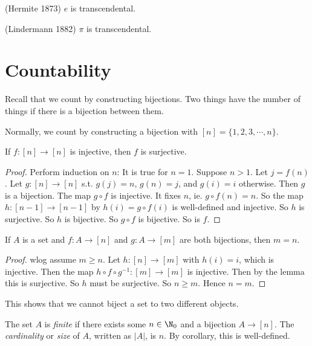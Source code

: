 \documentclass[a4paper]{article}
\begin{document}
  \begin{thm}
    (Hermite 1873) $e$ is transcendental. 
  \end{thm}
  \begin{thm}
    (Lindermann 1882) $\pi$ is transcendental.
  \end{thm}

  \section{Countability}
  Recall that we count by constructing bijections. Two things have the number of things if there is a bijection between them.

  Normally, we count by constructing a bijection with $[n] = \{1, 2, 3, \cdots, n\}$.

  \begin{lemma}
    If $f:[n] \to [n]$ is injective, then $f$ is surjective. 
  \end{lemma}

  \begin{proof}
    Perform induction on $n$: It is true for $n = 1$. Suppose $n > 1$. Let $j = f(n)$. Let $g: [n]\to [n]$ s.t. $g(j) = n$, $g(n) = j$, and $g(i) = i$ otherwise. Then $g$ is a bijection. The map $g\circ f$ is injective. It fixes $n$, ie. $g\circ f(n) = n$. So the map $h:[n - 1]\to [n - 1]$ by $h(i) = g\circ f(i)$ is well-defined and injective. So $h$ is surjective. So $h$ is bijective. So $g\circ f$ is bijective. So is $f$.
  \end{proof}

  \begin{cor}
    If $A$ is a set and $f: A\to [n]$ and $g: A\to [m]$ are both bijections, then $m = n$.
  \end{cor}

  \begin{proof}
    wlog assume $m \geq n$. Let $h: [n]\to [m]$ with $h(i) = i$, which is injective. Then the map $h\circ f\circ g^{-1}: [m]\to [m]$ is injective. Then by the lemma this is surjective. So $h$ must be surjective. So $n\geq m$. Hence $n = m$.
  \end{proof}
  This shows that we cannot biject a set to two different objects.

  \begin{defi}
    The set $A$ is \emph{finite} if there exists some $n\in\N_0$ and a bijection $A\to [n]$. The \emph{cardinality} or \emph{size} of $A$, written as $|A|$, is $n$. By corollary, this is well-defined.
  \end{defi}
\end{document}
